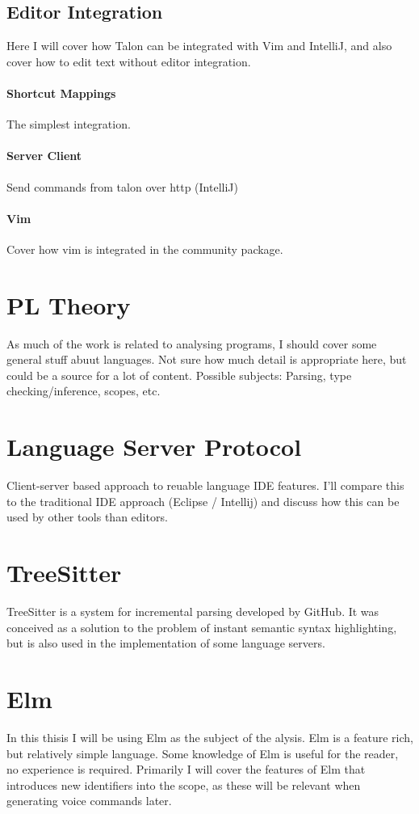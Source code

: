 \documentclass[a4paper,english]{ifimaster}
\begin{document}
\subsection{Editor Integration}
Here I will cover how Talon can be integrated with Vim and IntelliJ, and also cover how to edit text without editor integration.
\paragraph{Shortcut Mappings}
The simplest integration. 
\paragraph{Server Client}
Send commands from talon over http (IntelliJ)
\paragraph{Vim}
Cover how vim is integrated in the community package.

\section{PL Theory}
As much of the work is related to analysing programs, I should cover some general stuff abuut languages.
Not sure how much detail is appropriate here, but could be a source for a lot of content.
Possible subjects: Parsing, type checking/inference, scopes, etc.

\section{Language Server Protocol}
Client-server based approach to reuable language IDE features.
I'll compare this to the traditional IDE approach (Eclipse / Intellij)
and discuss how this can be used by other tools than editors.

\section{TreeSitter}
TreeSitter is a system for incremental parsing developed by GitHub.
It was conceived as a solution to the problem of instant semantic syntax highlighting,
but is also used in the implementation of some language servers.

\section{Elm}
In this thisis I will be using Elm as the subject of the alysis.
Elm is a feature rich, but relatively simple language.
Some knowledge of Elm is useful for the reader, no experience is required.
Primarily I will cover the features of Elm that introduces new identifiers into the scope,
as these will be relevant when generating voice commands later.
\end{document}
